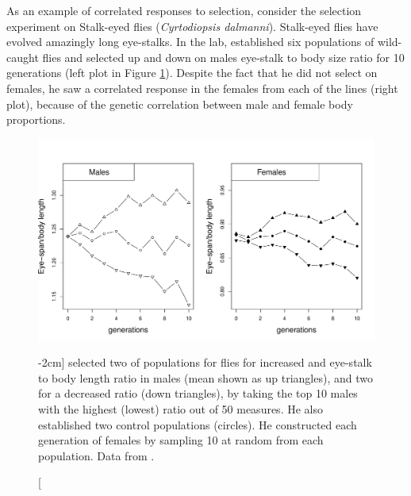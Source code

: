 As an example of correlated responses to selection, consider the  \citet{wilkinson:93} selection experiment on Stalk-eyed
 flies ({\it Cyrtodiopsis  dalmanni}). Stalk-eyed flies have evolved amazingly long eye-stalks. In the lab, \citeauthor{wilkinson:93} established six populations of
 wild-caught flies and selected up and down on males eye-stalk to body
 size ratio for 10 generations (left plot in Figure
 \ref{fig:Stalk_eyed_response}). Despite the fact that he did not
 select on females, he saw a correlated response in the females from
 each of the lines (right plot), because of the genetic correlation
 between male and female body proportions. 

\begin{figure}
\begin{center}
\includegraphics[width= \textwidth]{Journal_figs/Quant_gen/stalk_eyed_flies/stalk_eyed_flies_response.pdf}
\end{center}
\caption[][-2cm]{ \citeauthor{wilkinson:93} selected two of populations for flies for
 increased and eye-stalk to body length ratio in males (mean shown as
 up triangles), and two for a
 decreased ratio (down triangles), by taking the top 10 males with the highest (lowest)
 ratio out of 50 measures. He also established two control populations
 (circles). He constructed each generation of females by sampling 10
 at random from each population.  Data from \citet{wilkinson:93}.  } \label{fig:Stalk_eyed_response}   %
\end{figure}

